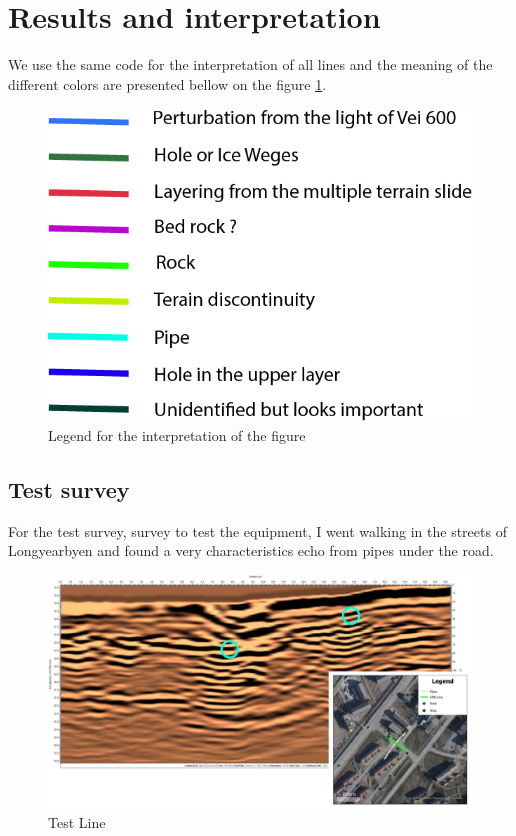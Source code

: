 \newpage
\section{Results and interpretation} \label{section:result}

We use the same code for the interpretation of all lines and the meaning of the different colors are presented bellow on the figure \ref{fig:legend}.

\begin{figure}[H]
    \centering
    \includegraphics[width=0.5\linewidth]{Images/00_Results/Legend.jpg}
    \caption{Legend for the interpretation of the figure }
    \label{fig:legend}
\end{figure}


\subsection{Test survey}

For the test survey, survey to test the equipment, I went walking in the streets of Longyearbyen and found a very characteristics echo from pipes under the road.

\begin{figure}
    \centering
    \includegraphics[width=\linewidth]{Images/00_Results/Test_line_edited.jpg}
    \caption{Test Line}
    \label{fig:testLine}
\end{figure}

